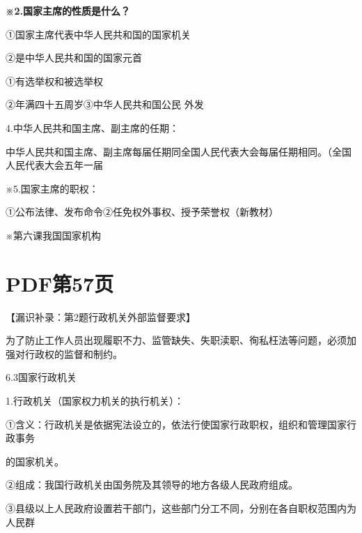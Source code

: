 \documentclass[lang=cn,11pt]{elegantbook}
\newcommand{\daofasym}[1]{{\daofasymbolfont #1}}
\newcommand{\daofasym}[1]{#1}
\begin{document}
\textbf{※2.国家主席的性质是什么？}\par

\daofasym{①}国家主席代表中华人民共和国的国家机关\par

\daofasym{②}是中华人民共和国的国家元首\par

\daofasym{①}有选举权和被选举权\par

\daofasym{②}年满四十五周岁\daofasym{③}中华人民共和国公民 外发\par

4.中华人民共和国主席、副主席的任期：\par

中华人民共和国主席、副主席每届任期同全国人民代表大会每届任期相同。（全国人民代表大会五年一届\par

※5.国家主席的职权：\par

\daofasym{①}公布法律、发布命令\daofasym{②}任免权外事权、授予荣誉权（新教材）\par

※第六课我国国家机构\par


\section*{PDF第57页}

【漏识补录：第2题行政机关外部监督要求】\par

为了防止工作人员出现履职不力、监管缺失、失职渎职、徇私枉法等问题，必须加强对行政权的监督和制约。\par

6.3国家行政机关\par

1.行政机关（国家权力机关的执行机关）：\par

\daofasym{①}含义：行政机关是依据宪法设立的，依法行使国家行政职权，组织和管理国家行政事务\par

的国家机关。\par

\daofasym{②}组成：我国行政机关由国务院及其领导的地方各级人民政府组成。\par

\daofasym{③}县级以上人民政府设置若干部门，这些部门分工不同，分别在各自职权范围内为人民群\par
\end{document}
